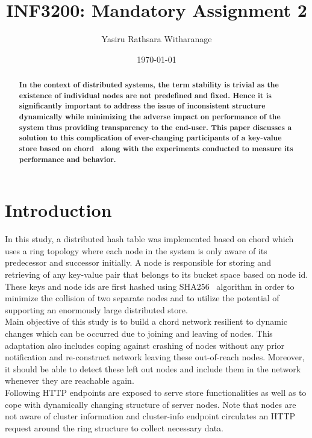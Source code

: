 \documentclass[
    a4paper,
    twocolumn,
]{article}
\title{INF3200: Mandatory Assignment 2}
\author{Yasiru Rathsara Witharanage}
\date{\today}
\begin{document}
\maketitle

\begin{abstract}
    \textbf{In the context of distributed systems, the term stability is trivial as the existence of individual nodes are not predefined and fixed. Hence it is significantly important to address the issue of inconsistent structure dynamically while minimizing the adverse impact on performance of the system thus providing transparency to the end-user. This paper discusses a solution to this complication of ever-changing participants of a key-value store based on chord~\cite{1} along with the experiments conducted to measure its performance and behavior.}
\end{abstract}

\section{Introduction}

In this study, a distributed hash table was implemented based on chord which uses a ring topology where each node in the system is only aware of its predecessor and successor initially. A node is responsible for storing and retrieving of any key-value pair that belongs to its bucket space based on node id. These keys and node ids are first hashed using SHA256~\cite{2} algorithm in order to minimize the collision of two separate nodes and to utilize the potential of supporting an enormously large distributed store.\\

Main objective of this study is to build a chord network resilient to dynamic changes which can be occurred due to joining and leaving of nodes. This adaptation also includes coping against crashing of nodes without any prior notification and re-construct network leaving these out-of-reach nodes. Moreover, it should be able to detect these left out nodes and include them in the network whenever they are reachable again.\\

Following HTTP endpoints are exposed to serve store functionalities as well as to cope with dynamically changing structure of server nodes. Note that nodes are not aware of cluster information and cluster-info endpoint circulates an HTTP request around the ring structure to collect necessary data. 
\end{document}
